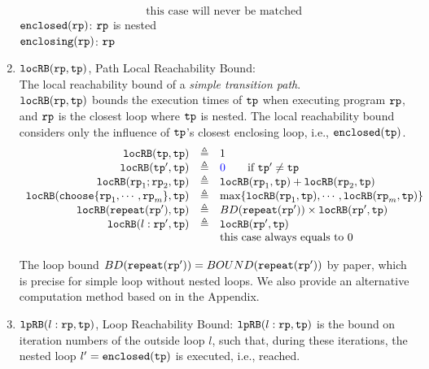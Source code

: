 \begin{enumerate}
\[\begin{array}{rcl}
        &  & \text{this case will never be matched}
        \end{array}
      \]
%
      ${\mathtt{enclosed}}({\mathtt{rp}})$:  ${\mathtt{rp}}$ is nested
      \\
      ${\mathtt{enclosing}}({\mathtt{rp}})$:  ${\mathtt{rp}}$
%
\item ${\mathtt{locRB}}({\mathtt{rp}}, {\mathtt{tp}})$, Path Local Reachability Bound:
\\
The local reachability bound of a \emph{simple transition path}. 
\\
${\mathtt{locRB}}({\mathtt{rp}}, {\mathtt{tp}})$ bounds the execution times of ${\mathtt{tp}}$ when executing program ${\mathtt{rp}}$,
and ${\mathtt{rp}}$ is the closest loop where ${\mathtt{tp}}$ is nested.
The local reachability bound  considers only the influence of ${\mathtt{tp}}$'s closest enclosing loop, i.e., ${\mathtt{enclosed}}({\mathtt{tp}})$.
%
\[
  \begin{array}{rcl}
    \outinB(\tpath, \tpath) & \triangleq & 1 \\
    \outinB(\tpath', \tpath) & \triangleq & \highlight{0} \qquad \text{if } \tpath' \neq \tpath\\
    \outinB(\rprog_1;\rprog_2, \tpath) & \triangleq & \outinB(\rprog_1, \tpath) + \outinB(\rprog_2, \tpath) \\
    \outinB(\rpchoose{\rprog_1, \cdots, \rprog_m }, \tpath) & \triangleq 
    & \max\left\{ \outinB(\rprog_1, \tpath), \cdots, \outinB(\rprog_m, \tpath) \right\} \\
    \outinB(\rprepeat(\rprog'), \tpath) & \triangleq 
    & BD(\rprepeat(\rprog'))
     \times \outinB(\rprog', \tpath)
     \\
    \outinB(l: \rprog', \tpath) & \triangleq & \outinB(\rprog', \tpath) \\
    &  & \text{this case always equals to } 0 \\
  \end{array}
  \]

  The loop bound $BD({\mathtt{repeat}}({\mathtt{rp}}')) = BOUND({\mathtt{repeat}}({\mathtt{rp}}'))$ by paper\cite{GulwaniJK09}, which is precise for simple loop without nested loops. 
  We also provide an alternative computation method based on \cite{sinn2017complexity} in the Appendix.
      \item ${\mathtt{lpRB}}(l: {\mathtt{rp}}, {\mathtt{tp}})$,
      {Loop Reachability Bound}:
        ${\mathtt{lpRB}}(l: {\mathtt{rp}}, {\mathtt{tp}})$
        is the bound on iteration numbers of the outside loop $l$,
        such that,
        during these iterations, the nested loop $l' = {\mathtt{enclosed({\mathtt{tp}})}}$ is executed, i.e., reached.
        

\end{enumerate}
